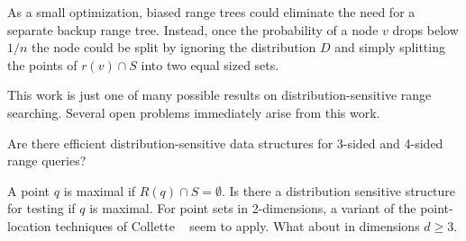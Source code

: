 \documentclass[lotsofwhite,charterfonts]{patmorin}
\begin{document}
As a small optimization, biased range trees could eliminate the need
for a separate backup range tree. Instead, once the probability of a
node $v$ drops below $1/n$ the node could be split by ignoring the
distribution $D$ and simply splitting the points of $r(v)\cap S$ into
two equal sized sets.

This work is just one of many possible results on
distribution-sensitive range searching.  Several open problems
immediately arise from this work.

\begin{op}
Are there efficient distribution-sensitive data structures for 3-sided
and 4-sided range queries?
\end{op}

\begin{op}
A point $q$ is maximal if $R(q)\cap S=\emptyset$.  Is there a distribution
sensitive structure for testing if $q$ is maximal.  For point sets in
2-dimensions,
a variant of the point-location techniques of Collette \etal\
\cite{cXX} seem to apply.  What about in dimensions $d\ge 3$.
\end{op}
\end{document}
